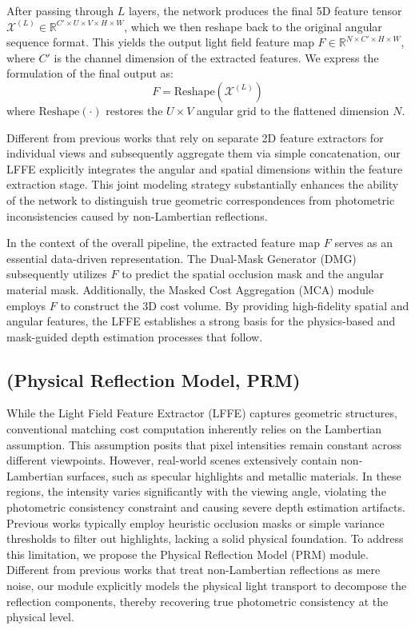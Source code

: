 After passing through $L$ layers, the network produces the final 5D feature tensor $\mathcal{X}^{(L)} \in \mathbb{R}^{C' \times U \times V \times H \times W}$, which we then reshape back to the original angular sequence format. This yields the output light field feature map $F \in \mathbb{R}^{N \times C' \times H \times W}$, where $C'$ is the channel dimension of the extracted features. We express the formulation of the final output as:
\begin{equation}
\label{eq:eq27}
F = \text{Reshape}\left( \mathcal{X}^{(L)} \right)
\end{equation}
where $\text{Reshape}(\cdot)$ restores the $U \times V$ angular grid to the flattened dimension $N$. 

Different from previous works that rely on separate 2D feature extractors for individual views and subsequently aggregate them via simple concatenation, our LFFE explicitly integrates the angular and spatial dimensions within the feature extraction stage. This joint modeling strategy substantially enhances the ability of the network to distinguish true geometric correspondences from photometric inconsistencies caused by non-Lambertian reflections. 

In the context of the overall pipeline, the extracted feature map $F$ serves as an essential data-driven representation. The Dual-Mask Generator (DMG) subsequently utilizes $F$ to predict the spatial occlusion mask and the angular material mask. Additionally, the Masked Cost Aggregation (MCA) module employs $F$ to construct the 3D cost volume. By providing high-fidelity spatial and angular features, the LFFE establishes a strong basis for the physics-based and mask-guided depth estimation processes that follow.

\subsection{(Physical Reflection Model, PRM)}

While the Light Field Feature Extractor (LFFE) captures geometric structures, conventional matching cost computation inherently relies on the Lambertian assumption. This assumption posits that pixel intensities remain constant across different viewpoints. However, real-world scenes extensively contain non-Lambertian surfaces, such as specular highlights and metallic materials. In these regions, the intensity varies significantly with the viewing angle, violating the photometric consistency constraint and causing severe depth estimation artifacts. Previous works typically employ heuristic occlusion masks or simple variance thresholds to filter out highlights, lacking a solid physical foundation. To address this limitation, we propose the Physical Reflection Model (PRM) module. Different from previous works that treat non-Lambertian reflections as mere noise, our module explicitly models the physical light transport to decompose the reflection components, thereby recovering true photometric consistency at the physical level.

